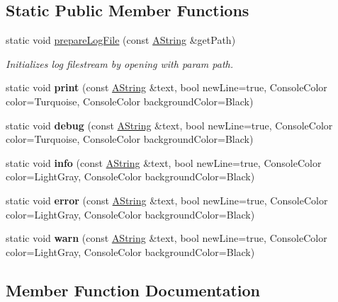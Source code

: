 \subsection*{Static Public Member Functions}
\begin{DoxyCompactItemize}
\item 
static void \mbox{\hyperlink{class_logger_a793354f22911ebbc1a0278dd733dbb56}{prepare\+Log\+File}} (const \mbox{\hyperlink{class_a_string}{A\+String}} \&get\+Path)
\begin{DoxyCompactList}\small\item\em Initializes log filestream by opening with param path. \end{DoxyCompactList}\item 
\mbox{\label{class_logger_ad1b7ae86299fa93628358c1b8e77a9b4}} 
static void {\bfseries print} (const \mbox{\hyperlink{class_a_string}{A\+String}} \&text, bool new\+Line=true, Console\+Color color=Turquoise, Console\+Color background\+Color=Black)
\item 
\mbox{\label{class_logger_ab986fb958b936fc1271fd4acf9553971}} 
static void {\bfseries debug} (const \mbox{\hyperlink{class_a_string}{A\+String}} \&text, bool new\+Line=true, Console\+Color color=Turquoise, Console\+Color background\+Color=Black)
\item 
\mbox{\label{class_logger_aee760667718f08ead13726b60d8c5ca6}} 
static void {\bfseries info} (const \mbox{\hyperlink{class_a_string}{A\+String}} \&text, bool new\+Line=true, Console\+Color color=Light\+Gray, Console\+Color background\+Color=Black)
\item 
\mbox{\label{class_logger_a359e37a5d634c018a2aac5ba480e86a0}} 
static void {\bfseries error} (const \mbox{\hyperlink{class_a_string}{A\+String}} \&text, bool new\+Line=true, Console\+Color color=Light\+Gray, Console\+Color background\+Color=Black)
\item 
\mbox{\label{class_logger_a67f08cc48a12528669b3fcee0bc982fd}} 
static void {\bfseries warn} (const \mbox{\hyperlink{class_a_string}{A\+String}} \&text, bool new\+Line=true, Console\+Color color=Light\+Gray, Console\+Color background\+Color=Black)
\end{DoxyCompactItemize}


\subsection{Member Function Documentation}
\mbox{\label{class_logger_a793354f22911ebbc1a0278dd733dbb56}} 
